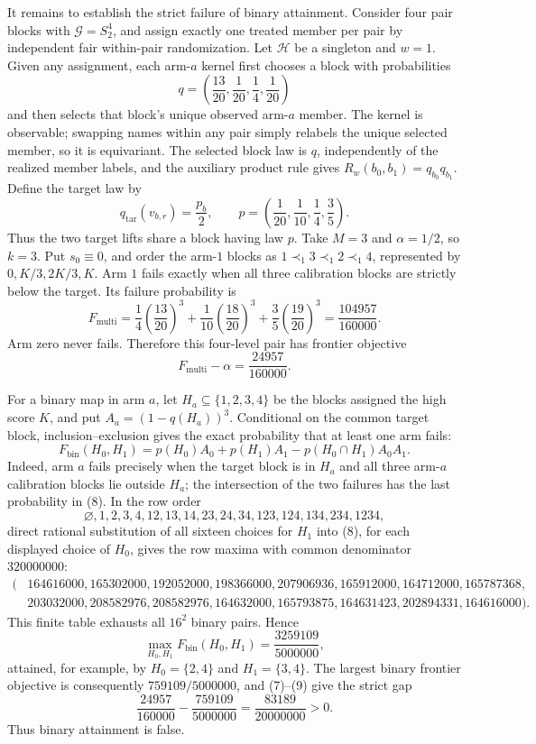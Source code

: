 It remains to establish the strict failure of binary attainment. Consider four pair blocks with \(\mathcal G=S_2^4\), and assign exactly one treated member per pair by independent fair within-pair randomization. Let \(\mathcal H\) be a singleton and \(w=1\). Given any assignment, each arm-\(a\) kernel first chooses a block with probabilities
\[q=\left(\frac{13}{20},\frac1{20},\frac14,\frac1{20}\right)\]
and then selects that block's unique observed arm-\(a\) member. The kernel is observable; swapping names within any pair simply relabels the unique selected member, so it is equivariant. The selected block law is \(q\), independently of the realized member labels, and the auxiliary product rule gives \(R_w(b_0,b_1)=q_{b_0}q_{b_1}\). Define the target law by
\[q_{\mathrm{tar}}(v_{b,r})=\frac{p_b}{2},\qquad p=\left(\frac1{20},\frac1{10},\frac14,\frac35\right).\]
Thus the two target lifts share a block having law \(p\). Take \(M=3\) and \(\alpha=1/2\), so \(k=3\). Put \(s_0\equiv0\), and order the arm-\(1\) blocks as \(1\prec_1 3\prec_1 2\prec_1 4\), represented by \(0,K/3,2K/3,K\). Arm \(1\) fails exactly when all three calibration blocks are strictly below the target. Its failure probability is
\[F_{\mathrm{multi}}=\frac14\left(\frac{13}{20}\right)^3+\frac1{10}\left(\frac{18}{20}\right)^3+\frac35\left(\frac{19}{20}\right)^3=\frac{104957}{160000}.\tag{6}\]
Arm zero never fails. Therefore this four-level pair has frontier objective
\[F_{\mathrm{multi}}-\alpha=\frac{24957}{160000}.\tag{7}\]

For a binary map in arm \(a\), let \(H_a\subseteq\{1,2,3,4\}\) be the blocks assigned the high score \(K\), and put \(A_a=(1-q(H_a))^3\). Conditional on the common target block, inclusion--exclusion gives the exact probability that at least one arm fails:
\[F_{\mathrm{bin}}(H_0,H_1)=p(H_0)A_0+p(H_1)A_1-p(H_0\cap H_1)A_0A_1.\tag{8}\]
Indeed, arm \(a\) fails precisely when the target block is in \(H_a\) and all three arm-\(a\) calibration blocks lie outside \(H_a\); the intersection of the two failures has the last probability in (8). In the row order
\[\varnothing,1,2,3,4,12,13,14,23,24,34,123,124,134,234,1234,\]
direct rational substitution of all sixteen choices for \(H_1\) into (8), for each displayed choice of \(H_0\), gives the row maxima with common denominator \(320000000\):
\[\begin{split}(&164616000,165302000,192052000,198366000,207906936,165912000,164712000,165787368,\\&203032000,208582976,208582976,164632000,165793875,164631423,202894331,164616000).\end{split}\tag{9}\]
This finite table exhausts all \(16^2\) binary pairs. Hence
\[\max_{H_0,H_1}F_{\mathrm{bin}}(H_0,H_1)=\frac{3259109}{5000000},\]
attained, for example, by \(H_0=\{2,4\}\) and \(H_1=\{3,4\}\). The largest binary frontier objective is consequently \(759109/5000000\), and (7)--(9) give the strict gap
\[\frac{24957}{160000}-\frac{759109}{5000000}=\frac{83189}{20000000}>0.\]
Thus binary attainment is false.

